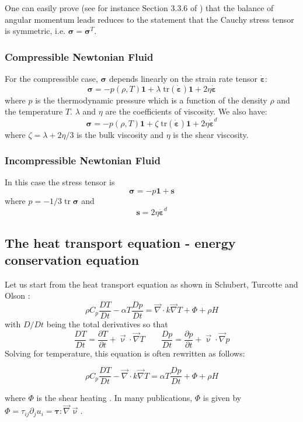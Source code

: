One can easily prove (see for instance Section 3.3.6 of \cite{grbl09}) that the balance 
of angular momentum leads reduces to the statement that the Cauchy stress tensor 
is symmetric, i.e. ${\bm \sigma}={\bm \sigma}^T$.

\subsubsection{Compressible Newtonian Fluid}

For the compressible case, ${\bm \sigma}$ 
depends linearly on the strain rate tensor $\dot{\bm \varepsilon}$: 
\[
{\bm \sigma} = -p(\rho,T) {\bm 1} + \lambda \; \text{tr} (\dot{\bm \varepsilon}) {\bm 1} + 2\eta \dot{\bm \varepsilon}
\]
where $p$ is the thermodynamic pressure which is a function of the density $\rho$ and the temperature $T$.
$\lambda$ and $\eta$ are the coefficients of viscosity. 
We also have:
\[
{\bm \sigma} = -p(\rho,T) {\bm 1} + \zeta \; \text{tr} (\dot{\bm \varepsilon}) {\bm 1} + 2\eta \dot{\bm \varepsilon}^d
\]
where $\zeta=\lambda+2\eta/3$ is the bulk viscosity and $\eta$ is the shear viscosity.

\subsubsection{Incompressible Newtonian Fluid}

In this case the stress tensor is 
\[
{\bm \sigma}=-p {\bm 1} + {\bm s}
\]
where $p=-1/3 \; \text{tr} \; \bm \sigma$ and 
\[
{\bm s}=2\eta \dot{\bm \varepsilon}^d
\]

\subsection{The heat transport equation - energy conservation equation}

Let us start from the heat transport equation as shown in Schubert, Turcotte and Olson \cite{scto01}:
\begin{equation}
\rho C_p \frac{DT}{Dt} - \alpha T \frac{Dp}{Dt} = {\vec \nabla} \cdot k {\vec \nabla} T + \Phi + \rho H  
\end{equation}
with $D/Dt$ being the total derivatives so that 
\begin{equation}
\frac{DT}{Dt} = \frac{\partial T}{\partial t} + {\vec \upnu}\cdot {\vec \nabla}T
\quad\quad
\frac{Dp}{Dt} = \frac{\partial p}{\partial t} + {\vec \upnu}\cdot {\vec \nabla}p
\end{equation}
Solving for temperature, this equation is often rewritten as follows:
\begin{mdframed}[backgroundcolor=blue!5]
\begin{equation}
\rho C_p \frac{DT}{Dt} - {\vec \nabla} \cdot k {\vec \nabla} T =  \alpha T \frac{Dp}{Dt} + \Phi + \rho H  
\end{equation}
\end{mdframed}
where $\Phi$ is the shear heating \cite[p287]{reddybook2}. In many publications, $\Phi$ 
is given by $\Phi=\tau_{ij}\partial_j u_i={\bm \tau}:{\vec \nabla}{\vec \upnu}$.

